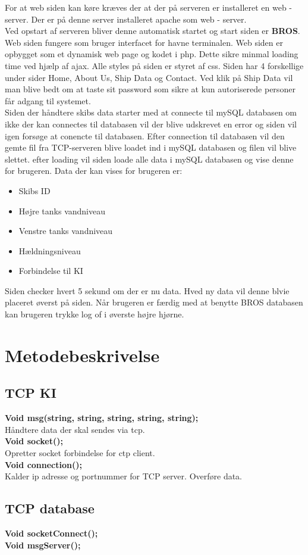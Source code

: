 For at web siden kan køre kræves der at der på serveren er installeret en web - server. Der er på denne server installeret apache som web - server.\\
Ved opstart af serveren bliver denne automatisk startet og start siden er \textbf{BROS}. Web siden fungere som bruger interfacet for havne terminalen. Web siden er opbygget som et dynamisk web page og kodet i php. Dette sikre minmal loading time ved hjælp af ajax. Alle styles på siden er styret af css. Siden har 4 forskellige under sider Home, About Us, Ship Data og Contact. Ved klik på Ship Data vil man blive bedt om at taste sit password som sikre at kun autoriserede personer får adgang til systemet.\\
Siden der håndtere skibs data starter med at connecte til mySQL databasen om ikke der kan connectes til databasen vil der blive udskrevet en error og siden vil igen forsøge at conencte til databasen. Efter connection til databasen vil den gemte fil fra TCP-serveren blive loadet ind i mySQL databasen og filen vil blive slettet. efter loading vil siden loade alle data i mySQL databasen og vise denne for brugeren. Data der kan vises for brugeren er:
\begin{itemize}
	\item Skibs ID
	\item Højre tanks vandniveau
	\item Venstre tanks vandniveau
	\item Hældningsniveau
	\item Forbindelse til KI
\end{itemize}
Siden checker hvert 5 sekund om der er nu data. Hved ny data vil denne blvie placeret øverst på siden.
Når brugeren er færdig med at benytte BROS databasen kan brugeren trykke log of i øverste højre hjørne.

\section{Metodebeskrivelse}
\subsection{TCP KI}
\textbf{Void msg(string, string, string, string, string);}\\
Håndtere data der skal sendes via tcp.\\
\textbf{Void socket();}\\
Opretter socket forbindelse for ctp client.\\
\textbf{Void connection();}\\
Kalder ip adresse og portnummer for TCP server. Overføre data.\\

\subsection{TCP database}
\textbf{Void socketConnect();}\\
\textbf{Void msgServer();}\\




